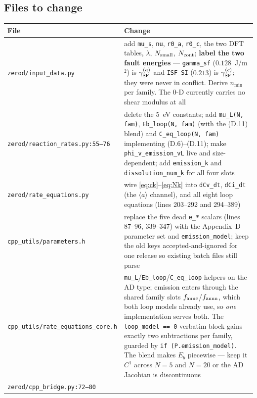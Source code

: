 \documentclass[11pt]{article}
\newcommand{\aloop}{\ensuremath{\langle a\rangle}}
\newcommand{\fbk}{\discretionary{}{}{}}   %
\newcommand{\file}[1]{\texttt{\small #1}}
\newcommand{\GSF}{\gamma_{\rm SF}}
\begin{document}
\subsection{Files to change}

{\small
\begin{longtable}{@{}p{}p{}@{}}
\toprule
\textbf{File} & \textbf{Change}\\
\midrule
\endhead
\file{zerod/\fbk input\_\fbk data.\fbk py}
  & add \verb|mu_s|, \verb|nu|, \verb|r0_a|, \verb|r0_c|, the two DFT tables,
    $\lambda$, $N_{\rm small}$, $N_{\rm cont}$; \textbf{label the two fault
    energies} --- \verb|gamma_sf| ($0.128$~J/m$^2$) is $\GSF^{(a)}$ and
    \verb|ISF_SI| ($0.213$) is $\GSF^{(c)}$; they were never in conflict.
    Derive $n_{\min}$ per family.  The 0-D currently carries no shear modulus
    at all\\
\addlinespace
\file{zerod/\fbk reaction\_\fbk rates.\fbk py:55--76}
  & delete the $5$~eV constants; add \verb|mu_L(N, fam)|,
    \verb|Eb_loop(N, fam)| (with the (D.11) blend) and
    \verb|C_eq_loop(N, fam)| implementing (D.6)--(D.11); make
    \verb|phi_v_emission_vL| live and size-dependent; add \verb|emission_k|
    and \verb|dissolution_num_k| for all four slots\\
\addlinespace
\file{zerod/\fbk rate\_\fbk equations.\fbk py}
  & wire \eqref{eq:ck}--\eqref{eq:Nk} into \verb|dCv_dt|, \verb|dCi_dt| (the
    \aloop{} channel), and all eight loop equations (lines 203--292 and
    294--389)\\
\addlinespace
\file{cpp\_\fbk utils/\fbk parameters.\fbk h}
  & replace the five dead \verb|e_*| scalars (lines 87--96, 339--347) with the
    Appendix~D parameter set and \verb|emission_model|; keep the old keys
    accepted-and-ignored for one release so existing batch files still parse\\
\addlinespace
\file{cpp\_\fbk utils/\fbk rate\_\fbk equations\_\fbk core.\fbk h}
  & \verb|mu_L|/\verb|Eb_loop|/\verb|C_eq_loop| helpers on the AD type;
    emission enters through the shared family slots
    $f_{\rm annc}$/$f_{\rm annn}$, which both loop models already use, so
    \emph{one} implementation serves both.  The \verb|loop_model == 0|
    verbatim block gains exactly two subtractions per family, guarded by
    \verb|if (P.emission_model)|.  The blend makes $E_b$ piecewise --- keep it
    $C^{1}$ across $N=5$ and $N=20$ or the AD Jacobian is discontinuous\\
\addlinespace
\file{zerod/\fbk cpp\_\fbk bridge.\fbk py:72--80}

\end{longtable}}
\end{document}
